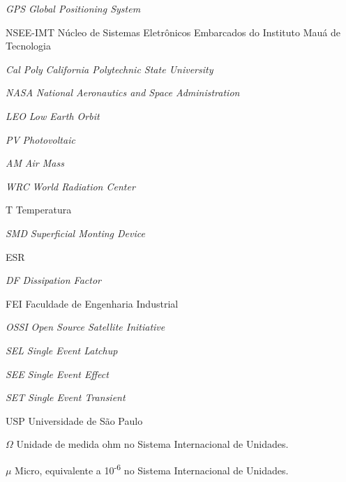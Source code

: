 \documentclass[
	12pt,				%
	openright,			%
	oneside,			%
	a4paper,			%
	english,			%
	french,				%
	spanish,			%
	brazil,				%
	oldfontcommands
	]{abntex2}
\begin{document}
\listoftables*
\cleardoublepage

\begin{siglas}

  \item[\textit{GPS}] \textit{Global Positioning System}
  \item[NSEE-IMT] Núcleo de Sistemas Eletrônicos Embarcados do Instituto Mauá de Tecnologia
  \item[\textit{Cal Poly}] \textit{California Polytechnic State University}
  \item[\textit{NASA}] \textit{National Aeronautics and Space Administration}
  \item[\textit{LEO}] \textit{Low Earth Orbit}
  \item[\textit{PV}] \textit{Photovoltaic}
  \item[\textit{AM}] \textit{Air Mass}
  \item[\textit{WRC}] \textit{World Radiation Center}
  \item[T] Temperatura
  \item[\textit{SMD}] \textit{Superficial Monting Device}
  \item[ESR]
  \item[\textit{DF}] \textit{Dissipation Factor}
  \item[FEI] Faculdade de Engenharia Industrial
  \item[\textit{OSSI}] \textit{Open Source Satellite Initiative}
  \item[\textit{SEL}]\textit{Single Event Latchup}
  \item[\textit{SEE}]\textit{Single Event Effect}
  \item[\textit{SET}]\textit{Single Event Transient}
  \item[USP] Universidade de São Paulo
  
  
    
\end{siglas}

\begin{simbolos}
  \item[$ \Omega $] Unidade de medida ohm no Sistema Internacional de Unidades.
  \item[$ \mu $] Micro, equivalente a 10\textsuperscript{-6} no Sistema Internacional de Unidades.
\end{simbolos}
\end{document}
